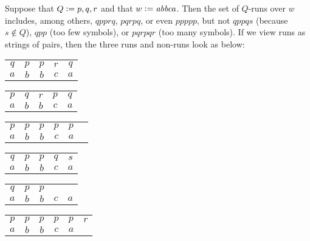 \begin{examplebox}
    Suppose that $Q \mathrel{\mathop:}= {p,q,r}$ and that $w \mathrel{\mathop:}= \mathit{abbca}$.
    Then the set of $Q$-runs over $w$ includes, among others, $qpprq$, $pqrpq$, or even $ppppp$, but not $qppqs$ (because $s \notin Q$), $qpp$ (too few symbols), or $pqrpqr$ (too many symbols).
    If we view runs as strings of pairs, then the three runs and non-runs look as below:
    \begin{center}
        \begin{tabular}{ccccc}
            $q$ & $p$ & $p$ & $r$ & $q$\\
            $a$ & $b$ & $b$ & $c$ & $a$
        \end{tabular}
        \hspace{1em}
        \begin{tabular}{ccccc}
            $p$ & $q$ & $r$ & $p$ & $q$\\
            $a$ & $b$ & $b$ & $c$ & $a$
        \end{tabular}
        \hspace{1em}
        \begin{tabular}{cccccc}
            $p$ & $p$ & $p$ & $p$ & $p$ & \phantom{$r$}\\
            $a$ & $b$ & $b$ & $c$ & $a$ &
        \end{tabular}
        
        \vspace{1em}

        \begin{tabular}{ccccc}
            $q$ & $p$ & $p$ & $q$ & $s$\\
            $a$ & $b$ & $b$ & $c$ & $a$
        \end{tabular}
        \hspace{1em}
        \begin{tabular}{ccccc}
            $q$ & $p$ & $p$ &     &\\
            $a$ & $b$ & $b$ & $c$ & $a$
        \end{tabular}
        \hspace{1em}
        \begin{tabular}{cccccc}
            $p$ & $p$ & $p$ & $p$ & $p$ & $r$\\
            $a$ & $b$ & $b$ & $c$ & $a$ &
        \end{tabular}
    \end{center}
\end{examplebox}

